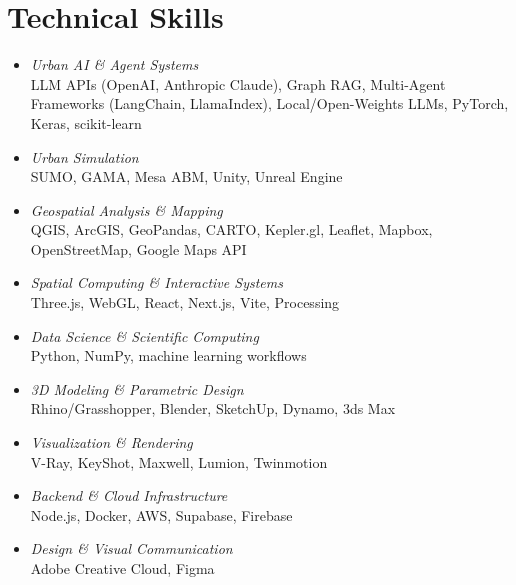 \section*{Technical Skills}

\begin{itemize}
    \item \textit{Urban AI \& Agent Systems} \\ LLM APIs (OpenAI, Anthropic Claude), Graph RAG, Multi-Agent Frameworks (LangChain, LlamaIndex), Local/Open-Weights LLMs, PyTorch, Keras, scikit-learn
    \item \textit{Urban Simulation} \\ SUMO, GAMA, Mesa ABM, Unity, Unreal Engine
    \item \textit{Geospatial Analysis \& Mapping} \\ QGIS, ArcGIS, GeoPandas, CARTO, Kepler.gl, Leaflet, Mapbox, OpenStreetMap, Google Maps API
    \item \textit{Spatial Computing \& Interactive Systems} \\ Three.js, WebGL, React, Next.js, Vite, Processing
    \item \textit{Data Science \& Scientific Computing} \\ Python, NumPy, machine learning workflows
    \item \textit{3D Modeling \& Parametric Design} \\ Rhino/Grasshopper, Blender, SketchUp, Dynamo, 3ds Max
    \item \textit{Visualization \& Rendering} \\ V-Ray, KeyShot, Maxwell, Lumion, Twinmotion
    \item \textit{Backend \& Cloud Infrastructure} \\ Node.js, Docker, AWS, Supabase, Firebase
    \item \textit{Design \& Visual Communication} \\ Adobe Creative Cloud, Figma
\end{itemize}


